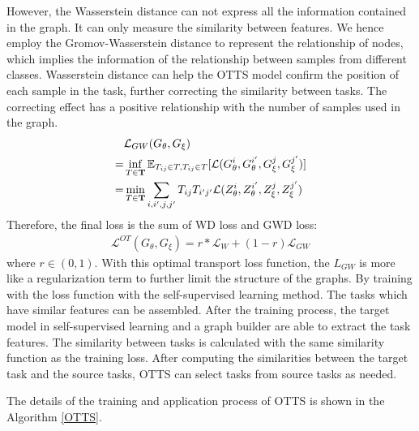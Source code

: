 \documentclass[10pt,journal,compsoc]{IEEEtran}
\begin{document}
However, the Wasserstein distance can not express all the information contained in the graph. It can only measure the similarity between features. We hence employ the Gromov-Wasserstein distance to represent the relationship of nodes, which implies the information of the relationship between samples from different classes. Wasserstein distance can help the OTTS model confirm the position of each sample in the task, further correcting the similarity between tasks. The correcting effect has a positive relationship with the number of samples used in the graph.
\begin{align}
    &\mathcal{L}_{GW}(G_\theta,G_\xi)\notag\\
    = &\inf_{T\in\mathbf{T}} \mathbb{E}_{T_{ij} \in T,T_{ij} \in T}[\mathcal{L}(G_\theta^i,G_\theta^{i'},G_\xi^j,G_\xi^{j'})]\notag\\
    =&\min_{T\in\mathbf{T}} \sum_{i,i',j,j'} T_{ij}T_{i'j'}\mathcal{L}(Z_\theta^i,Z_\theta^{i'},Z_\xi^j,Z_\xi^{j'})
\end{align}
Therefore, the final loss is the sum of WD loss and GWD loss:
\begin{align}
    \mathcal{L}^{OT}(G_\theta,G_\xi) = r*\mathcal{L}_{W}+(1-r)\mathcal{L}_{GW}
\end{align}
where $r\in(0,1)$. With this optimal transport loss function, the $L_{GW}$ is more like a regularization term to further limit the structure of the graphs. By training with the loss function with the self-supervised learning method. The tasks which have similar features can be assembled. After the training process, the target model in self-supervised learning and a graph builder are able to extract the task features. The similarity between tasks is calculated with the same similarity function as the training loss. After computing the similarities between the target task and the source tasks, OTTS can select tasks from source tasks as needed.

The details of the training and application process of OTTS is shown in the Algorithm \ref{OTTS}.
\end{document}

